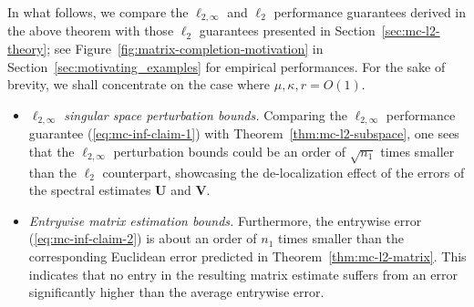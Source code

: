 

In what follows, we compare the $\ell_{2,\infty}$ and $\ell_{2}$ performance
guarantees derived in the above theorem with those $\ell_{2}$ guarantees presented
in Section~\ref{sec:mc-l2-theory}; see Figure~\ref{fig:matrix-completion-motivation} in Section~\ref{sec:motivating_examples} for empirical performances. For the sake of brevity, we shall concentrate on the case where $\mu,\kappa,r=O(1)$.




\begin{itemize}

\item {\em $\ell_{2,\infty}$ singular space perturbation bounds. }
Comparing the $\ell_{2,\infty}$ performance guarantee (\ref{eq:mc-inf-claim-1}) with  Theorem~\ref{thm:mc-l2-subspace}, one sees that the $\ell_{2,\infty}$ perturbation bounds could be an order of $\sqrt{n_1}$ times smaller than the $\ell_{2}$ counterpart, showcasing the de-localization effect of the errors of the spectral estimates $\bm{U}$ and $\bm{V}$.

\item {\em Entrywise matrix estimation bounds. }
Furthermore, the entrywise error (\ref{eq:mc-inf-claim-2}) is about an order of $n_1$ times smaller than the corresponding Euclidean error predicted  in Theorem~\ref{thm:mc-l2-matrix}. This indicates that no entry in the resulting matrix estimate suffers from an error significantly higher than the average entrywise error.

\end{itemize}



